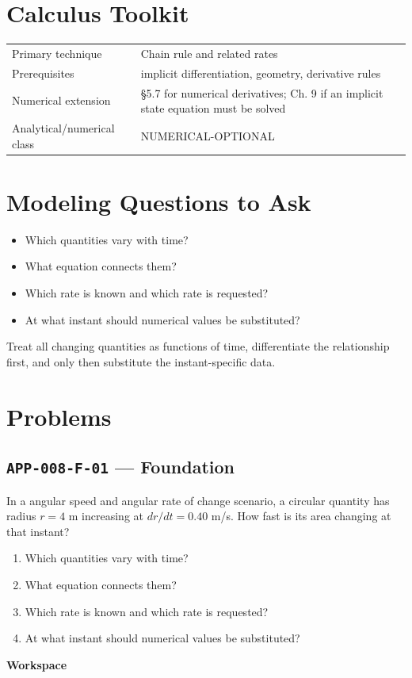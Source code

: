 \documentclass[11pt]{book}
\newcommand{\pid}[1]{\texttt{#1}}
\newcommand{\workspace}{\par\vspace{0.7in}\hrulefill\par\vspace{0.55in}\hrulefill\par}
\begin{document}
\section*{Calculus Toolkit}
\begin{tabularx}{\textwidth}{@{}lX@{}}\toprule
Primary technique & Chain rule and related rates \\
Prerequisites & implicit differentiation, geometry, derivative rules \\
Numerical extension & §5.7 for numerical derivatives; Ch. 9 if an implicit state equation must be solved \\
Analytical/numerical class & NUMERICAL-OPTIONAL \\
\bottomrule\end{tabularx}
\section*{Modeling Questions to Ask}\begin{itemize}
\item Which quantities vary with time?
\item What equation connects them?
\item Which rate is known and which rate is requested?
\item At what instant should numerical values be substituted?
\end{itemize}
\begin{errorbox}Treat all changing quantities as functions of time, differentiate the relationship first, and only then substitute the instant-specific data.\end{errorbox}
\section*{Problems}
\subsection*{\pid{APP-008-F-01} — Foundation}
\begin{problembox}
In a angular speed and angular rate of change scenario, a circular quantity has radius $r=4$ m increasing at $dr/dt=0.40$ m/s. How fast is its area changing at that instant?
\end{problembox}
\begin{promptbox}\begin{enumerate}
\item Which quantities vary with time?
\item What equation connects them?
\item Which rate is known and which rate is requested?
\item At what instant should numerical values be substituted?
\end{enumerate}\end{promptbox}
\textbf{Workspace}\workspace
{}
\end{document}
